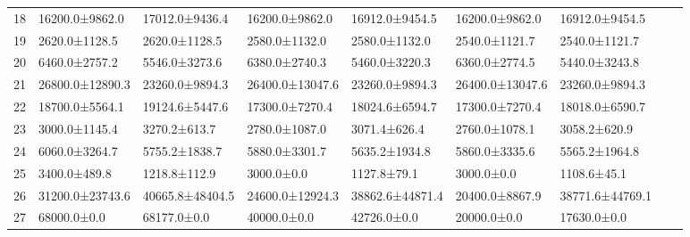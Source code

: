 \begin{tabular}{|r|l|l|l|l|l|l|l|l|}
  18 & 16200.0±9862.0 & 17012.0±9436.4 & 16200.0±9862.0 & 16912.0±9454.5 & 16200.0±9862.0 & 16912.0±9454.5 \\ 
  19 & 2620.0±1128.5 & 2620.0±1128.5 & 2580.0±1132.0 & 2580.0±1132.0 & 2540.0±1121.7 & 2540.0±1121.7 \\ 
  20 & 6460.0±2757.2 & 5546.0±3273.6 & 6380.0±2740.3 & 5460.0±3220.3 & 6360.0±2774.5 & 5440.0±3243.8 \\ 
  21 & 26800.0±12890.3 & 23260.0±9894.3 & 26400.0±13047.6 & 23260.0±9894.3 & 26400.0±13047.6 & 23260.0±9894.3 \\ 
  22 & 18700.0±5564.1 & 19124.6±5447.6 & 17300.0±7270.4 & 18024.6±6594.7 & 17300.0±7270.4 & 18018.0±6590.7 \\ 
  23 & 3000.0±1145.4 & 3270.2±613.7 & 2780.0±1087.0 & 3071.4±626.4 & 2760.0±1078.1 & 3058.2±620.9 \\ 
  24 & 6060.0±3264.7 & 5755.2±1838.7 & 5880.0±3301.7 & 5635.2±1934.8 & 5860.0±3335.6 & 5565.2±1964.8 \\ 
  25 & 3400.0±489.8 & 1218.8±112.9 & 3000.0±0.0 & 1127.8±79.1 & 3000.0±0.0 & 1108.6±45.1 \\ 
  26 & 31200.0±23743.6 & 40665.8±48404.5 & 24600.0±12924.3 & 38862.6±44871.4 & 20400.0±8867.9 & 38771.6±44769.1 \\ 
  27 & 68000.0±0.0 & 68177.0±0.0 & 40000.0±0.0 & 42726.0±0.0 & 20000.0±0.0 & 17630.0±0.0 \\ 
\end{tabular}
